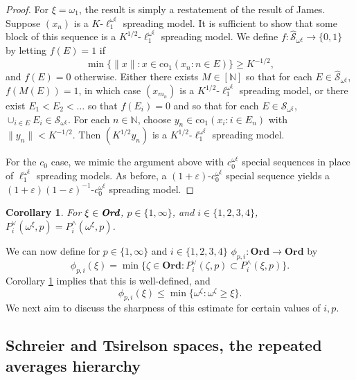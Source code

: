 \documentclass[12pt]{amsart}
\newtheorem{corollary}[theorem]{Corollary}
\theoremstyle{definition}
\newcommand{\infin}{[\mathbb{N}]}
\newcommand{\ord}{\textbf{Ord}}
\newcommand{\nn}{\mathbb{N}}
\newcommand{\sss}{\mathcal{S}}
\begin{document}
\begin{proof} For $\xi=\omega_1$, the result is simply a restatement of the result of James.  Suppose $(x_n)$ is a $K$-$\ell_1^{\omega^\xi}$ spreading model.  It is sufficient to show that some block of this sequence is a $K^{1/2}$-$\ell_1^{\omega^\xi}$ spreading model.  We define $f:\widehat{\sss}_{\omega^\xi}\to \{0,1\}$ by letting $f(E)=1$ if $$\min \{\|x\|: x\in \text{co}_1(x_n:n\in E)\}\geqslant K^{-1/2},$$ and $f(E)=0$ otherwise.  Either there exists $M\in \infin$ so that for each $E\in \widehat{\sss}_{\omega^\xi}$, $f(M(E))=1$, in which case $(x_{m_n})$ is a $K^{1/2}$-$\ell_1^{\omega^\xi}$ spreading model, or there exist $E_1<E_2<\ldots$ so that $f(E_i)=0$ and so that for each $E\in \sss_{\omega^\xi}$, $\cup_{i\in E}E_i\in \sss_{\omega^\xi}$.  For each $n\in \nn$, choose $y_n\in \text{co}_1(x_i:i\in E_n)$ with $\|y_n\|<K^{-1/2}$.  Then $(K^{1/2}y_n)$ is a $K^{1/2}$-$\ell_1^{\omega^\xi}$ spreading model.  

For the $c_0$ case, we mimic the argument above with $c_0^{\omega^\xi}$ special sequences in place of $\ell_1^{\omega^\xi}$ spreading models.  As before, a $(1+\varepsilon)$-$c_0^{\omega^\xi}$ special sequence yields a $(1+\varepsilon)(1-\varepsilon)^{-1}$-$c_0^{\omega^\xi}$ spreading model.  



\end{proof}




\begin{corollary} For $\xi\in \emph{\ord}$, $p\in \{1, \infty\}$, and $i\in \{1,2,3,4\}$, $P^\vee_i(\omega^\xi, p)=P^\wedge_i(\omega^\xi, p)$.  

\label{reduction}


\end{corollary}


We can now define for $p\in \{1, \infty\}$ and $i\in \{1,2,3,4\}$ $\phi_{p,i}:\ord\to \ord$ by $$\phi_{p,i}(\xi)=\min \{\zeta\in \ord: P^\vee_i(\zeta, p)\subset P^\wedge_i(\xi, p)\}.$$  Corollary \ref{reduction} implies that this is well-defined, and $$\phi_{p,i}(\xi)\leqslant \min \{\omega^\zeta: \omega^\zeta\geqslant \xi\}.$$  We next aim to discuss the sharpness of this estimate for certain values of $i, p$.  

\subsection{Schreier and Tsirelson spaces, the repeated averages hierarchy}
\end{document}
